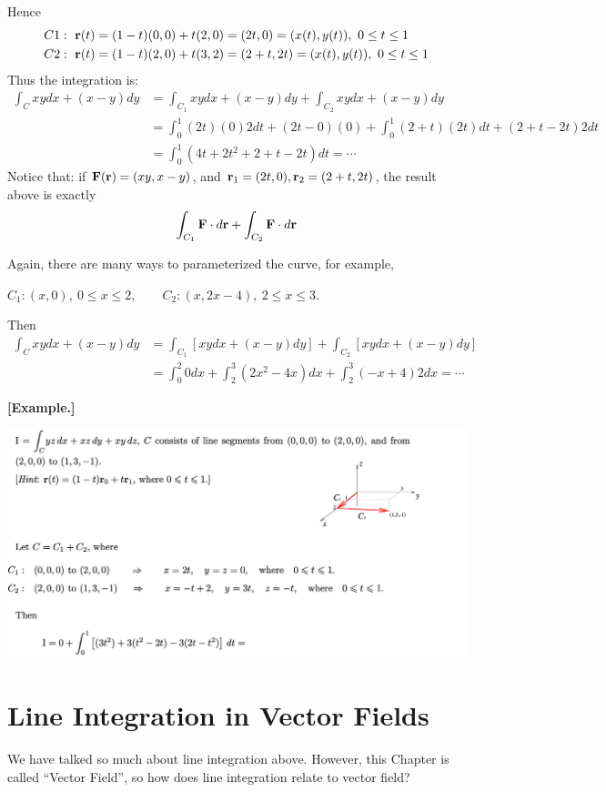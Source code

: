 \documentclass[11pt, a4paper]{MATH2023}
\newcommand{\eg}{\textbf{[Example.] }}
\newcommand{\rr}{{\bf r}}
\newcommand{\FF}{{\bf F}}
\begin{document}
\begin{spacing}{1.3}
    Hence 
    \begin{align*}
        C1: \ \rr(t) &= (1-t)(0, 0) + t(2, 0) = (2t, 0) = (x(t), y(t)),\ 0\le t\le 1\\
        C2: \ \rr(t) &= (1-t)(2, 0) + t(3, 2) = (2+t, 2t) = (x(t), y(t)),\ 0\le t\le 1
    \end{align*}
    Thus the integration is: 
    \begin{align*}
        \int_C xydx+(x-y)dy &= \int_{C_1} xydx+(x-y)dy + \int_{C_2} xydx+(x-y)dy\\
                    &= \int_0^1 (2t)(0) 2dt+(2t-0)(0) +\int_0^1 (2+t)(2t)dt + (2+t-2t) 2dt\\
                    &= \int_0^1 (4t+2t^2+2+t-2t) dt =\cdots
    \end{align*}
    {\blue Notice that: } if $\FF(\rr)=(xy, x-y)$, and $\rr_1=(2t, 0), \rr_2=(2+t,2t)$, 
    the result above is exactly 
    $$\int_{C_1} \FF\cdot d\rr + \int_{C_2} \FF\cdot d\rr$$

    {\blue Again, there are many ways to parameterized the curve, } for example,

    $C_{1}: (x, 0),\  0 \le x \le 2, \qquad C_{2}: (x, 2x-4),\  2 \le x \le 3 .$ 
    
    Then
    \begin{align*}
        \int_{C} x y d x+(x-y) d y 
        &=\int_{C_{1}}[x y d x+(x-y) d y]+\int_{C_{2}}[x y d x+(x-y) d y] \\
        &=\int_{0}^{2} 0 d x+\int_{2}^{3}\left(2 x^{2}-4 x\right) d x+\int_{2}^{3}(-x+4) 2 d x = \cdots
    \end{align*}

    \newpage
    \eg 
    \begin{center}
        \includegraphics[scale=0.52]{images/Ch15-wrt-eg2.png}
    \end{center}

    \newpage
    \section{Line Integration in Vector Fields}
    We have talked so much about line integration above. However, this Chapter is called ``Vector Field'',
    so how does line integration relate to vector field?


\end{spacing}
\end{document}
